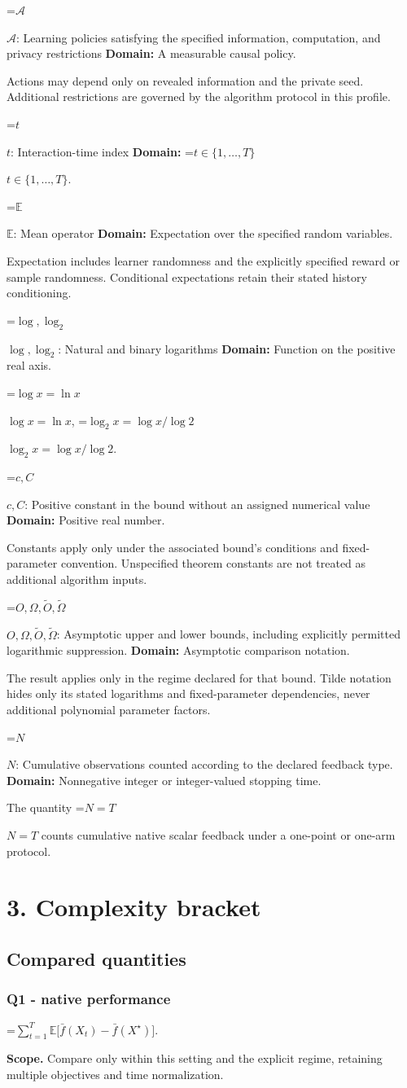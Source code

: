 \documentclass[10pt,a4paper]{article}
\newcommand{\AtlasMath}[1]{\par\begingroup\centering\setbox0=\hbox{$\displaystyle #1$}\ifdim\wd0>1.4\linewidth\typeout{ATLAS WIDE FORMULA: \the\wd0}\fi\ifdim\wd0>\linewidth\resizebox{\linewidth}{!}{\box0}\else\box0\fi\par\endgroup}
\newcommand{\AtlasInlineMath}[1]{\begingroup\setbox0=\hbox{$#1$}\ifdim\wd0>.4\linewidth\endgroup\AtlasMath{#1}\else\endgroup$#1$\fi}
\begin{document}
\AtlasInlineMath{\mathcal A}: Learning policies satisfying the specified information, computation, and privacy restrictions \textbf{Domain:} A measurable causal policy.

Actions may depend only on revealed information and the private seed. Additional restrictions are governed by the algorithm protocol in this profile.

\AtlasInlineMath{t}: Interaction-time index \textbf{Domain:} \AtlasInlineMath{t\in\{1,\ldots,T\}}.

\AtlasInlineMath{\mathbb E}: Mean operator \textbf{Domain:} Expectation over the specified random variables.

Expectation includes learner randomness and the explicitly specified reward or sample randomness. Conditional expectations retain their stated history conditioning.

\AtlasInlineMath{\log,\log_2}: Natural and binary logarithms \textbf{Domain:} Function on the positive real axis.

\AtlasInlineMath{\log x=\ln x}, \AtlasInlineMath{\log_2x=\log x/\log2}.

\AtlasInlineMath{c,C}: Positive constant in the bound without an assigned numerical value \textbf{Domain:} Positive real number.

Constants apply only under the associated bound’s conditions and fixed-parameter convention. Unspecified theorem constants are not treated as additional algorithm inputs.

\AtlasInlineMath{O,\Omega,\widetilde O,\widetilde\Omega}: Asymptotic upper and lower bounds, including explicitly permitted logarithmic suppression. \textbf{Domain:} Asymptotic comparison notation.

The result applies only in the regime declared for that bound. Tilde notation hides only its stated logarithms and fixed-parameter dependencies, never additional polynomial parameter factors.

\AtlasInlineMath{N}: Cumulative observations counted according to the declared feedback type. \textbf{Domain:} Nonnegative integer or integer-valued stopping time.

The quantity \AtlasInlineMath{N=T} counts cumulative native scalar feedback under a one-point or one-arm protocol.

\section{3. Complexity bracket}
\subsection{Compared quantities}
\subsubsection{Q1 - native performance}
\AtlasMath{\sum_{t=1}^{T}\mathbb E\bigl[\bar f(X_t)-\bar f(X^\star)\bigr].}
\textbf{Scope.} Compare only within this setting and the explicit regime, retaining multiple objectives and time normalization.
\end{document}
